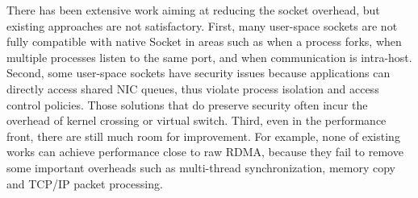 There has been extensive work aiming at reducing the socket overhead, but existing approaches are not satisfactory.
First, many user-space sockets are not fully compatible with native Socket in areas such as when a process forks, when multiple processes listen to the same port, and when communication is intra-host.
Second, some user-space sockets have security issues because applications can directly access shared NIC queues, thus violate process isolation and access control policies.
Those solutions that do preserve security often incur the overhead of kernel crossing or virtual switch.
Third, even in the performance front, there are still much room for improvement. For example, none of existing works can achieve performance close to raw RDMA, 
because they fail to remove some important overheads such as multi-thread synchronization, memory copy and TCP/IP packet processing.


